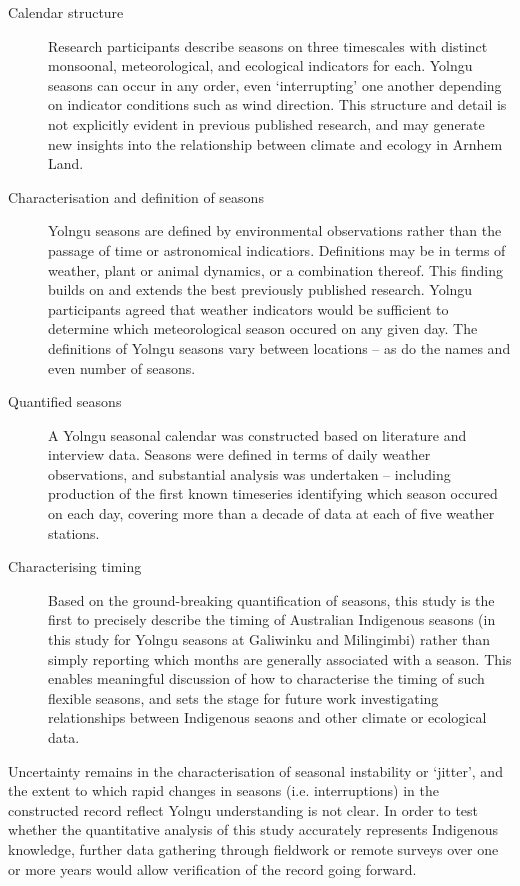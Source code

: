\begin{description}
\item[Calendar structure]
    Research participants describe seasons on three timescales with distinct
    monsoonal, meteorological, and ecological indicators for each.
    Yolngu seasons can occur in any order, even `interrupting' one another
    depending on indicator conditions such as wind direction.  This structure
    and detail is not explicitly evident in previous published research, and
    may generate new insights into the relationship between climate and
    ecology in Arnhem Land.

\item[Characterisation and definition of seasons]
    Yolngu seasons are defined by environmental observations rather than the
    passage of time or astronomical indicatiors.  Definitions may be in terms
    of weather, plant or animal dynamics, or a combination thereof.
    This finding builds on and extends the best previously published research.
    Yolngu participants agreed that weather indicators would be sufficient to
    determine which meteorological season occured on any given day.  The definitions of
    Yolngu seasons vary between locations -- as do the names and even number
    of seasons.

\item[Quantified seasons]
    A Yolngu seasonal calendar was constructed based on literature
    and interview data.  Seasons were defined in terms of daily weather
    observations, and substantial analysis was undertaken -- including
    production of the first known timeseries identifying which season occured
    on each day, covering more than a decade of data at each of five weather
    stations.

\item[Characterising timing]
    Based on the ground-breaking quantification of seasons, this study is the
    first to precisely describe the timing of Australian Indigenous seasons
    (in this study for Yolngu seasons at Galiwinku and Milingimbi)
    rather than simply reporting which months
    are generally associated with a season.  This enables meaningful
    discussion of how to characterise the timing of such flexible seasons,
    and sets the stage for future work investigating relationships between
    Indigenous seaons and other climate or ecological data.
\end{description}

Uncertainty remains in the characterisation of seasonal instability or `jitter',
and the extent to which rapid changes in seasons (i.e. interruptions) in the
constructed record reflect Yolngu understanding is not clear.
In order to test whether the quantitative analysis of this study accurately
represents Indigenous knowledge, further data gathering through fieldwork or
remote surveys over one or more years would allow verification of the record
going forward.


